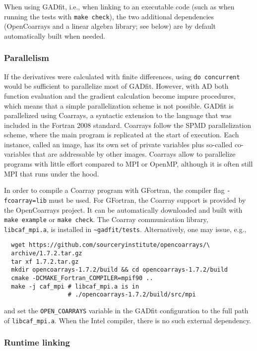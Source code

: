 \documentclass{article}
\begin{document}
When using GADfit, i.e., when linking to an executable code (such as when running the tests with \texttt{make check}), the two additional dependencies (OpenCoarrays and a linear algebra library; see below) are by default automatically built when needed.

\subsubsection{\label{sec:parallelism}Parallelism}

If the derivatives were calculated with finite differences, using \texttt{do concurrent} would be sufficient to parallelize most of GADfit. However, with AD both function evaluation and the gradient calculation become impure procedures, which means that a simple parallelization scheme is not possible. GADfit is parallelized using Coarrays, a syntactic extension to the language that was included in the Fortran 2008 standard. Coarrays follow the SPMD parallelization scheme, where the main program is replicated at the start of execution. Each instance, called an image, has its own set of private variables plus so-called co-variables that are addressable by other images. Coarrays allow to parallelize programs with little effort compared to MPI or OpenMP, although it is often still MPI that runs under the hood.

In order to compile a Coarray program with GFortran, the compiler flag \texttt{-fcoarray=lib} must be used. For GFortran, the Coarray support is provided by the OpenCoarrays project. It can be automatically downloaded and built with \texttt{make example} or \texttt{make check}. The Coarray communication library, \verb+libcaf_mpi.a+, is installed in \verb+~gadfit/tests+. Alternatively, one may issue, e.g.,
\begin{verbatim}
  wget https://github.com/sourceryinstitute/opencoarrays/\
  archive/1.7.2.tar.gz
  tar xf 1.7.2.tar.gz
  mkdir opencoarrays-1.7.2/build && cd opencoarrays-1.7.2/build
  cmake -DCMAKE_Fortran_COMPILER=mpif90 ..
  make -j caf_mpi # libcaf_mpi.a is in
                  # ./opencoarrays-1.7.2/build/src/mpi
\end{verbatim}
and set the \verb+OPEN_COARRAYS+ variable in the GADfit configuration to the full path of \verb+libcaf_mpi.a+. When the Intel compiler, there is no such external dependency.

\subsubsection{\label{sec:runtime}Runtime linking}
\end{document}
